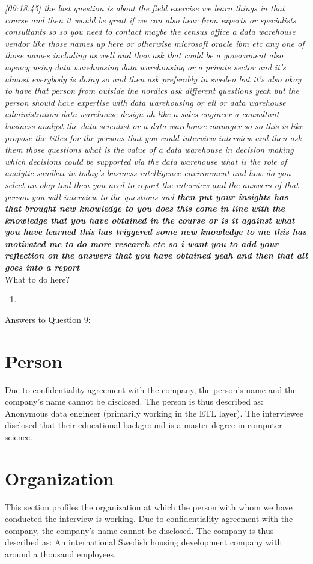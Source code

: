 \emph{[00:18:45] the last question is about the field exercise we learn things in that course and then
it would be great if we can also hear from experts or specialists consultants so so you need to contact
maybe the census office a data warehouse vendor like those names up here or otherwise microsoft oracle ibm etc any
one of those names including as well and then ask that could be a government also agency using
data warehousing data warehousing or a private sector and it's almost everybody is doing so and then ask
preferably in sweden but it's also okay to have that person from outside the nordics ask different
questions yeah but the person should have expertise with data warehousing or etl or data warehouse
administration data warehouse design uh like a sales engineer a consultant business analyst the data
scientist or a data warehouse manager so so this is like propose the titles for the persons that you could interview
interview and then ask them those questions what is the value of a data warehouse in decision making
which decisions could be supported via the data warehouse what is the role of analytic sandbox in
today's business intelligence environment and how do you select an olap tool then you need to report
the interview and the answers of that person you will interview to the questions and \textbf{then put your
insights has that brought new knowledge to you does this come in line with the knowledge that you have
obtained in the course or is it against what you have learned this has triggered some new knowledge to me
this has motivated me to do more research etc so i want you to add your reflection on the answers that
you have obtained yeah and then that all goes into a report}}\\

What to do here?
\begin{enumerate}
    \item 
  \end{enumerate}


\newpage Answers to Question 9:
\section{Person}
Due to confidentiality agreement with the company, the person's name and the company's name cannot be disclosed. The person is thus described as:
Anonymous data engineer (primarily working in the ETL layer). The interviewee disclosed that their educational background is a master degree in computer science.

\section{Organization}
This section profiles the organization at which the person with whom we have conducted the interview is working. 
Due to confidentiality agreement with the company, the company's name cannot be disclosed. The company is thus described as:
An international Swedish housing development company with around a thousand employees.
